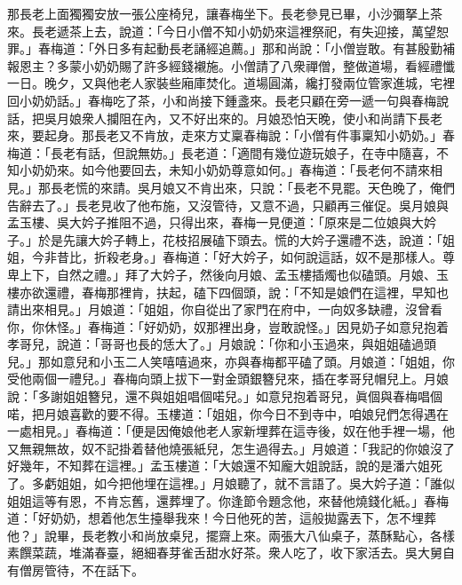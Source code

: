 那長老上面獨獨安放一張公座椅兒，讓春梅坐下。長老參見已畢，小沙彌拏上茶來。長老遞茶上去，說道：「今日小僧不知小奶奶來這裡祭祀，有失迎接，萬望恕罪。」春梅道：「外日多有起動長老誦經追薦。」那和尚說：「小僧豈敢。有甚殷勤補報恩主？多蒙小奶奶賜了許多經錢襯施。小僧請了八衆禪僧，整做道場，看經禮懺一日。晚夕，又與他老人家裝些廂庫焚化。道場圓滿，纔打發兩位管家進城，宅裡回小奶奶話。」春梅吃了茶，小和尚接下鍾盞來。長老只顧在旁一遞一句與春梅說話，把吳月娘衆人攔阻在內，又不好出來的。月娘恐怕天晚，使小和尚請下長老來，要起身。那長老又不肯放，走來方丈稟春梅說：「小僧有件事稟知小奶奶。」春梅道：「長老有話，但說無妨。」長老道：「適間有幾位遊玩娘子，在寺中隨喜，不知小奶奶來。如今他要回去，未知小奶奶尊意如何。」春梅道：「長老何不請來相見。」那長老慌的來請。吳月娘又不肯出來，只說：「長老不見罷。天色晚了，俺們告辭去了。」{}長老見收了他布施，又沒管待，又意不過，只顧再三催促。吳月娘與孟玉樓、吳大妗子推阻不過，只得出來，春梅一見便道：「原來是二位娘與大妗子。」於是先讓大妗子轉上，花枝招展磕下頭去。慌的大妗子還禮不迭，說道：「姐姐，今非昔比，折殺老身。」春梅道：「好大妗子，如何說這話，奴不是那樣人。{}尊卑上下，自然之禮。」拜了大妗子，然後向月娘、孟玉樓插燭也似磕頭。月娘、玉樓亦欲還禮，春梅那裡肯，扶起，磕下四個頭，說：「不知是娘們在這裡，早知也請出來相見。」月娘道：「姐姐，你自從出了家門在府中，一向奴多缺禮，沒曾看你，你休怪。」{}春梅道：「好奶奶，奴那裡出身，豈敢說怪。」{}因見奶子如意兒抱着孝哥兒，說道：「哥哥也長的恁大了。」月娘說：「你和小玉過來，與姐姐磕過頭兒。」那如意兒和小玉二人笑嘻嘻過來，亦與春梅都平磕了頭。月娘道：「姐姐，你受他兩個一禮兒。」春梅向頭上拔下一對金頭銀簪兒來，插在孝哥兒帽兒上。月娘說：「多謝姐姐簪兒，還不與姐姐唱個喏兒。」如意兒抱着哥兒，眞個與春梅唱個喏，把月娘喜歡的要不得。玉樓道：「姐姐，你今日不到寺中，咱娘兒們怎得遇在一處相見。」春梅道：「便是因俺娘他老人家新埋葬在這寺後，奴在他手裡一場，他又無親無故，奴不記掛着替他燒張紙兒，怎生過得去。」月娘道：「我記的你娘沒了好幾年，不知葬在這裡。」{}孟玉樓道：「大娘還不知龐大姐說話，說的是潘六姐死了。多虧姐姐，如今把他埋在這裡。」月娘聽了，就不言語了。吳大妗子道：「誰似姐姐這等有恩，不肯忘舊，還葬埋了。{}你逢節令題念他，來替他燒錢化紙。」春梅道：「好奶奶，想着他怎生擡舉我來！今日他死的苦，這般拋露丟下，怎不埋葬他？」{}說畢，長老教小和尚放桌兒，擺齋上來。兩張大八仙桌子，蒸酥點心，各樣素饌菜蔬，堆滿春臺，絕細春芽雀舌甜水好茶。衆人吃了，收下家活去。吳大舅自有僧房管待，不在話下。

